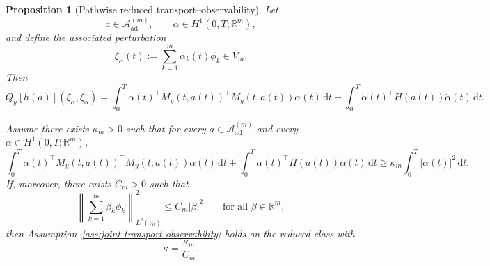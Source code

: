 \documentclass{article}
\newtheorem{proposition}[theorem]{Proposition}
\theoremstyle{definition}
\renewcommand{\d}{\mathrm{d}}
\begin{document}
\begin{proposition}[Pathwise reduced transport--observability]
    \label{prop:pathwise-reduced-observability}
    Let
    \[
        a\in \mathcal A_{\mathrm{ad}}^{(m)},
        \qquad
        \alpha\in H^1(0,T;\mathbb R^m),
    \]
    and define the associated perturbation
    \[
        \xi_\alpha(t):=\sum_{k=1}^m \alpha_k(t)\phi_k \in V_m.
    \]
    Then
    \begin{equation}
        \label{eq:pathwise-reduced-joint-form}
        Q_y[h(a)](\xi_\alpha,\xi_\alpha)
        =
        \int_0^T \alpha(t)^\top M_y(t,a(t))^\top M_y(t,a(t))\alpha(t)\,\d t
        +
        \int_0^T \dot\alpha(t)^\top H(a(t))\dot\alpha(t)\,\d t.
    \end{equation}

    Assume there exists \(\kappa_m>0\) such that for every \(a\in \mathcal A_{\mathrm{ad}}^{(m)}\) and every
    \(\alpha\in H^1(0,T;\mathbb R^m)\),
    \begin{equation}
        \label{eq:pathwise-reduced-coercivity}
        \int_0^T \alpha(t)^\top M_y(t,a(t))^\top M_y(t,a(t))\alpha(t)\,\d t
        +
        \int_0^T \dot\alpha(t)^\top H(a(t))\dot\alpha(t)\,\d t
        \ge
        \kappa_m \int_0^T |\alpha(t)|^2\,\d t.
    \end{equation}
    If, moreover, there exists \(C_m>0\) such that
    \begin{equation}
        \label{eq:reduced-coefficient-norm-equivalence}
        \left\|\sum_{k=1}^m \beta_k \phi_k\right\|_{L^2(\nu_0)}^2
        \le
        C_m |\beta|^2
        \qquad\text{for all } \beta\in\mathbb R^m,
    \end{equation}
    then Assumption~\ref{ass:joint-transport-observability} holds on the reduced class with
    \[
        \kappa=\frac{\kappa_m}{C_m}.
    \]
\end{proposition}
\end{document}
